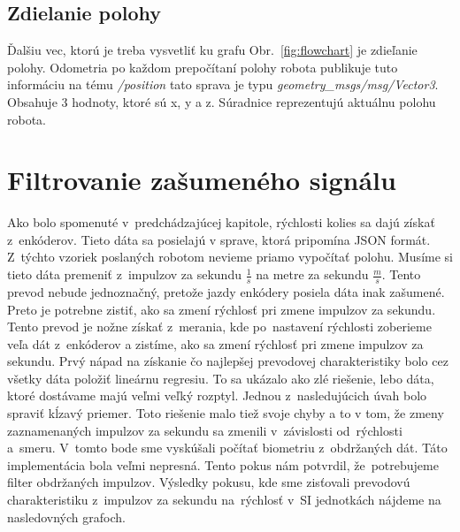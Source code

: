 \subsection{Zdielanie polohy}
\label{sec:zdielanie_polohy}

Ďalšiu vec, ktorú je treba vysvetliť ku grafu Obr.~\ref{fig:flowchart} je zdieľanie polohy. Odometria po každom prepočítaní polohy robota publikuje tuto
informáciu na tému \textit{/position} tato sprava je typu \textit{geometry\_msgs/msg/Vector3}. Obsahuje 3 hodnoty, ktoré sú x, y a z.
Súradnice reprezentujú aktuálnu polohu robota.

\section{Filtrovanie zašumeného signálu}
\label{sec:ziskavanieRychlosti}

Ako bolo spomenuté v~predchádzajúcej kapitole, rýchlosti kolies sa dajú získať z~enkóderov. Tieto dáta sa posielajú v sprave, ktorá pripomína JSON formát.
Z~týchto vzoriek poslaných robotom nevieme priamo vypočítať polohu. Musíme si tieto dáta premeniť z~impulzov za sekundu \(\frac{1}{s}\) na metre
za sekundu \(\frac{m}{s}\). Tento prevod nebude jednoznačný, pretože jazdy enkódery posiela dáta inak zašumené. Preto je potrebne zistiť, ako sa zmení
rýchlosť pri zmene impulzov za sekundu. Tento prevod je nožne získať z~merania, kde po~nastavení rýchlosti zoberieme veľa dát z~enkóderov a zistíme,
ako sa zmení rýchlosť pri zmene impulzov za sekundu. Prvý nápad na získanie čo najlepšej prevodovej charakteristiky bolo cez všetky dáta položiť
lineárnu regresiu. To sa ukázalo ako zlé riešenie, lebo dáta, ktoré dostávame majú veľmi veľký rozptyl. Jednou z~nasledujúcich úvah bolo spraviť
kĺzavý priemer. Toto riešenie malo tiež svoje chyby a to v tom, že zmeny zaznamenaných impulzov za sekundu sa zmenili v~závislosti od~rýchlosti a~smeru.
V~tomto bode sme vyskúšali počítať biometriu z~obdržaných dát. Táto implementácia bola veľmi nepresná. Tento pokus nám potvrdil, že~potrebujeme filter
obdržaných impulzov. Výsledky pokusu, kde sme zisťovali prevodovú charakteristiku z~impulzov za sekundu na~rýchlosť v~SI jednotkách nájdeme
na nasledovných grafoch.

